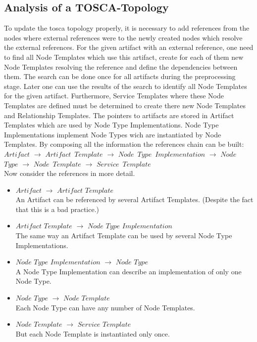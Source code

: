 \subsection{Analysis of a TOSCA-Topology}\label{subs:analyse}
To update the \gls{tosca} topology properly, it is necessary to add references from the nodes where external references were to the newly created nodes which resolve the external references. 
For the given artifact with an external reference, one need to find all Node Templates which use this artifact, create for each of them new Node Templates resolving the reference and define the dependencies between them.
The search can be done once for all artifacts during the preprocessing stage.
Later one can use the results of the search to identify all Node Templates for the given artifact.
Furthermore, Service Templates where these Node Templates are defined must be determined to create there new Node Templates and Relationship Templates.
The pointers to artifacts are stored in Artifact Templates which are used by Node Type Implementations.
Node Type Implementations implement Node Types wich are instantiated by Node Templates.
By composing all the information the references chain can be built:\\
$Artifact$ $\rightarrow$ $Artifact$~$Template$ $\rightarrow$ $Node$~$Type$~$Implementation$ $\rightarrow$ $Node$~$Type$ $\rightarrow$ $Node$~$Template$ $\rightarrow$ $Service$~$Template$\\
Now consider the references in more detail. 
\begin{itemize}
	\item $Artifact$ $\rightarrow$ $Artifact$ $Template$\\
	An Artifact can be referenced by several Artifact Templates. (Despite the fact that this is a bad practice.)
	\item  $Artifact$ $Template$ $\rightarrow$ $Node$ $Type$ $Implementation$ \\
	The same way an Artifact Template can be used by several Node Type Implementations.
	\item $Node$ $Type$ $Implementation$ $\rightarrow$ $Node$ $Type$ \\
	A Node Type Implementation can describe an implementation of only one Node Type.
	\item  $Node$ $Type$ $\rightarrow$ $Node$ $Template$\\
	Each Node Type can have any number of Node Templates.
	\item  $Node$ $Template$ $\rightarrow$ $Service$ $Template$\\
	But each Node Template is instantiated only once.
\end{itemize}
